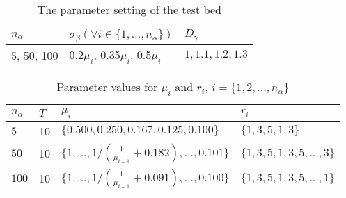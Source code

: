 \documentclass[preprint,12pt]{elsarticle}
\begin{document}

\begin{table}[htbp]
  \centering
  \caption{The parameter setting of the test bed}
    \begin{tabular}{lll}
    \toprule
  $n_{\alpha}$ & $\sigma_{\beta} (\forall i \in \{1,...,n_{\alpha}\})$ & $D_{\gamma}$\\
    \midrule
    5, 50, 100 & 0.2$\mu_{i}$, 0.35$\mu_{i}$, 0.5$\mu_{i}$ & $ 1, 1.1, 1.2, 1.3$ \\
  \bottomrule
    \end{tabular}%
  \label{tab:testbedps}%
\end{table}

\begin{table}[htbp]
  \centering
  \caption{Parameter values for $\mu_{i}$ and $r_{i}$, $i=\{1,2,...,n_{\alpha}\}$}
    \begin{tabular}{llll}
    \toprule
    $n_{\alpha}$ & $T$ & $\mu_{i}$ &  $r_{i}$\\
    \midrule
    $5$   &10& $\{0.500, 0.250, 0.167, 0.125, 0.100\}$ &$\{1,3,5,1,3\}$\\
    $50$  &10& $\{1,...,1/(\frac{1}{\mu_{i-1}}+0.182),...,0.101\}$ &$\{1,3,5,1,3,5,...,3\}$\\
    $100$ &10& $\{1,...,1/(\frac{1}{\mu_{i-1}}+0.091),...,0.100\}$ &$\{1,3,5,1,3,5,...,1\}$\\
    \bottomrule
    \end{tabular}%
  \label{tab:testbedmur}%
\end{table}
\end{document}
